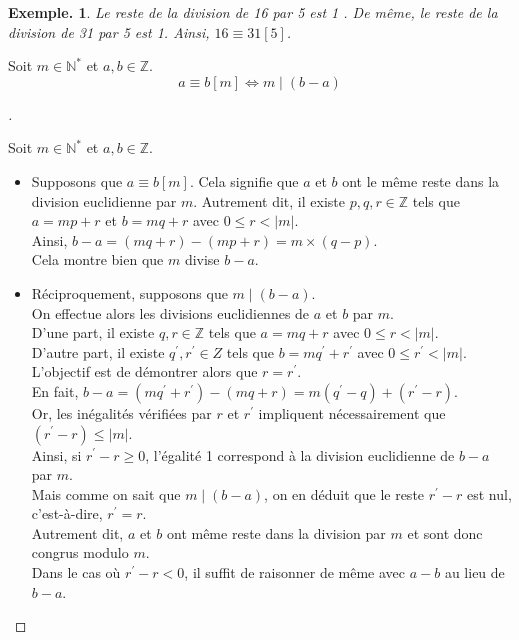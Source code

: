 \documentclass[12pt]{article}
\newcommand{\hideM}[1]{#1}
\theoremstyle{break}
\newtheorem*{example}{Exemple.}
\newenvironment{demo}[1][\proofname]{%
  \begin{proof}[#1]$ $\newline
}{%
  \end{proof}
}
\begin{document}
\begin{example}
    Le reste de la division de 16 par 5 est 1 . De même, le reste de la division de 31 par 5 est 1. Ainsi, $16 \equiv 31[5]$.
\end{example}

\begin{proposition}{}{}
    Soit $m \in \mathbb{N}^{*}$ et $a, b \in \mathbb{Z}$.
    $$
    \hideM{a \equiv b[m]} \Longleftrightarrow \hideM{m \mid(b-a)}
    $$
\end{proposition}

\begin{demo}
    Soit $m \in \mathbb{N}^{*}$ et $a, b \in \mathbb{Z}$.
    
    \begin{itemize}
        \item Supposons que $a \equiv b[m]$. Cela signifie que $a$ et $b$ ont le même reste dans la division euclidienne par $m$. Autrement dit, il existe $p, q, r \in \mathbb{Z}$ tels que $a=m p+r$ et $b=m q+r$ avec $0 \leqslant r<|m|$.\\
        Ainsi, $b-a=(m q+r)-(m p+r)=m \times(q-p)$.\\
        Cela montre bien que $m$ divise $b-a$.
        \item Réciproquement, supposons que $m \mid(b-a)$.\\
        On effectue alors les divisions euclidiennes de $a$ et $b$ par $m$.\\
        D'une part, il existe $q, r \in \mathbb{Z}$ tels que $a=m q+r$ avec $0 \leqslant r<|m|$.\\
        D'autre part, il existe $q^{\prime}, r^{\prime} \in Z$ tels que $b=m q^{\prime}+r^{\prime}$ avec $0 \leqslant r^{\prime}<|m|$.\\
        L'objectif est de démontrer alors que $r=r^{\prime}$.\\
        En fait, $b-a=\left(m q^{\prime}+r^{\prime}\right)-(m q+r)=m\left(q^{\prime}-q\right)+\left(r^{\prime}-r\right)$.\\
        Or, les inégalités vérifiées par $r$ et $r^{\prime}$ impliquent nécessairement que $\left(r^{\prime}-r\right) \leqslant|m|$.\\
        Ainsi, si $r^{\prime}-r \geqslant 0$, l'égalité 1 correspond à la division euclidienne de $b-a$ par $m$.\\
        Mais comme on sait que $m \mid(b-a)$, on en déduit que le reste $r^{\prime}-r$ est nul, c'est-à-dire, $r^{\prime}=r$.\\
        Autrement dit, $a$ et $b$ ont même reste dans la division par $m$ et sont donc congrus modulo $m$.\\
        Dans le cas où $r^{\prime}-r<0$, il suffit de raisonner de même avec $a-b$ au lieu de $b-a$.
    \end{itemize}
\end{demo}
\end{document}
